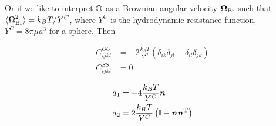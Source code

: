 \documentclass[thesis.tex]{subfiles}
\begin{document}
Or if we like to interpret $\mathbb{O}$ as a Brownian angular velocity $\mbox{\boldmath$\Omega$}_\mathrm{Br}$ such that $\langle \mbox{\boldmath$\Omega$}_\mathrm{Br}^2\rangle=k_B T/Y^C$, where $Y^C$ is the hydrodynamic resistance function, $Y^C=8 \pi \mu a^3$ for a sphere. Then

\begin{align*}
	C^{OO}_{ijkl} &= -2\frac{k_B T}{Y^C} \left(\delta_{ik}\delta_{jl}-\delta_{il}\delta_{jk}\right)\\
	C^{SS}_{ijkl} &= 0	
\end{align*}

\begin{align*}
	a_1 &= -4 \frac{k_B T}{Y^C} \mbox{\boldmath$n$}\\
	a_2 &= 2 \frac{k_B T}{Y^C} \left(\mathbb{I} - \mbox{\boldmath$n$}\mbox{\boldmath$n$}^{\mathrm T} \right)
\end{align*}
\end{document}

